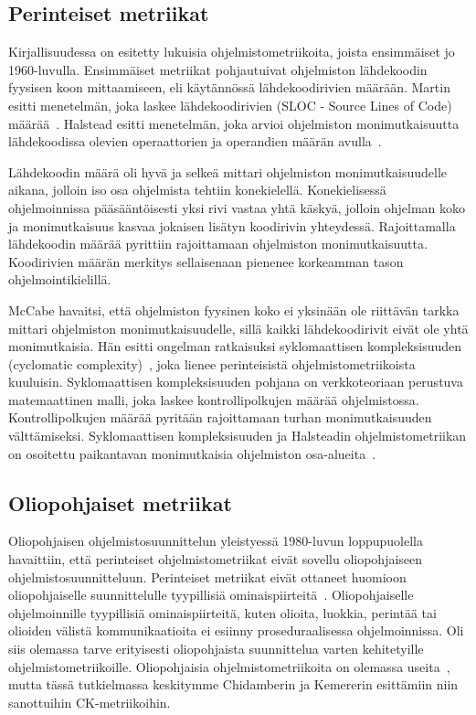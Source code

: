 \documentclass[finnish]{tktltiki2}
\theoremstyle{definition}
\theoremstyle{remark}
\begin{document}
\subsection{Perinteiset metriikat}

Kirjallisuudessa on esitetty lukuisia ohjelmistometriikoita, joista ensimmäiset jo 1960-luvulla. Ensimmäiset metriikat pohjautuivat ohjelmiston lähdekoodin fyysisen koon mittaamiseen, eli käytännössä lähdekoodirivien määrään. Martin esitti menetelmän, joka laskee lähdekoodirivien (SLOC - Source Lines of Code) määrää~\cite{M65}. Halstead esitti menetelmän, joka arvioi ohjelmiston monimutkaisuutta lähdekoodissa olevien operaattorien ja operandien määrän avulla~\cite{H72, H77}.

Lähdekoodin määrä oli hyvä ja selkeä mittari ohjelmiston monimutkaisuudelle aikana, jolloin iso osa ohjelmista tehtiin konekielellä. Konekielisessä ohjelmoinnissa pääsääntöisesti yksi rivi vastaa yhtä käskyä, jolloin ohjelman koko ja monimutkaisuus kasvaa jokaisen lisätyn koodirivin yhteydessä. Rajoittamalla lähdekoodin määrää pyrittiin rajoittamaan ohjelmiston monimutkaisuutta. Koodirivien määrän merkitys sellaisenaan pienenee korkeamman tason ohjelmointikielillä.

McCabe havaitsi, että ohjelmiston fyysinen koko ei yksinään ole riittävän tarkka mittari ohjelmiston monimutkaisuudelle, sillä kaikki lähdekoodirivit eivät ole yhtä monimutkaisia. Hän esitti ongelman ratkaisuksi syklomaattisen kompleksisuuden (cyclomatic complexity)~\cite{M76}, joka lienee perinteisistä ohjelmistometriikoista kuuluisin. Syklomaattisen kompleksisuuden pohjana on verkkoteoriaan perustuva matemaattinen malli, joka laskee kontrollipolkujen määrää ohjelmistossa. Kontrollipolkujen määrää pyritään rajoittamaan turhan monimutkaisuuden välttämiseksi. Syklomaattisen kompleksisuuden ja Halsteadin ohjelmistometriikan on osoitettu paikantavan monimutkaisia ohjelmiston osa-alueita~\cite{CSM79}.

\subsection{Oliopohjaiset metriikat}

Oliopohjaisen ohjelmistosuunnittelun yleistyessä 1980-luvun loppupuolella havaittiin, että perinteiset ohjelmistometriikat eivät sovellu oliopohjaiseen ohjelmistosuunnitteluun. Perinteiset metriikat eivät ottaneet huomioon oliopohjaiselle suunnittelulle tyypillisiä ominaispiirteitä~\cite{LH93, CK94}. Oliopohjaiselle ohjelmoinnille tyypillisiä ominaispiirteitä, kuten olioita, luokkia, perintää tai olioiden välistä kommunikaatioita ei esiinny proseduraalisessa ohjelmoinnissa. Oli siis olemassa tarve erityisesti oliopohjaista suunnittelua varten kehitetyille ohjelmistometriikoille. Oliopohjaisia ohjelmistometriikoita on olemassa useita~\cite{LH93, SC93}, mutta tässä tutkielmassa keskitymme Chidamberin ja Kemererin esittämiin niin sanottuihin CK-metriikoihin.
\end{document}

